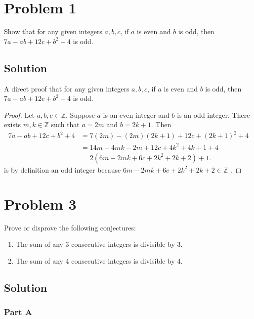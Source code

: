 \documentclass[12pt]{extarticle}
\begin{document}
\section*{Problem 1}

Show that for any given integers $a, b, c$, if $a$ is even and $b$ is odd, then $7a - ab + 12c + b^2 + 4$ is odd.

\subsection*{Solution}

A direct proof that for any given integers $a, b, c$, if $a$ is even and $b$ is odd, then $7a - ab + 12c + b^2 + 4$ is odd.

\begin{proof}
	Let $a, b, c \in \mathbb{Z}$. Suppose $a$ is an even integer and $b$ is an odd integer. There exists $m,k \in \mathbb{Z}$ such that $a = 2m$ and $b = 2k + 1$. Then
  \begin{align*}
  	7a - ab + 12c + b^2 + 4 &= 7(2m) - (2m)(2k+1) + 12c + (2k+1)^2 + 4 \\
  													&= 14m - 4mk - 2m + 12c + 4k^2 + 4k + 1 + 4 \\
  													&= 2(6m - 2mk + 6c + 2k^2 + 2k + 2) + 1 
  .\end{align*}
	is by definition an odd integer because $6m - 2mk + 6c + 2k^2 + 2k + 2 \in \mathbb{Z}$ .\qedhere
\end{proof}

\section*{Problem 3}

Prove or disprove the following conjectures: 

\begin{enumerate}[label=(\alph*)]
	\item The sum of any 3 consecutive integers is divisible by 3. 
	\item The sum of any 4 consecutive integers is divisible by 4.
\end{enumerate}

\subsection*{Solution}

\subsubsection*{Part A}
\end{document}
